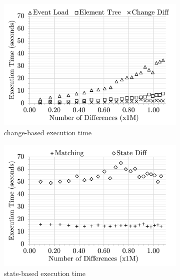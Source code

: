 \documentclass{llncs}
\begin{document}
\begin{figure}[ht]
    \centering
    \begin{subfigure}[t]{0.495\linewidth}
        \includegraphics[width=\linewidth]{images/Time-ChangeDiff-Detail}
        \caption{change-based execution time}
        \label{fig:time_changediff_detail}
    \end{subfigure}
    \hfill
    \begin{subfigure}[t]{0.495\linewidth}
        \includegraphics[width=\linewidth]{images/Time-StateDiff-Detail}
        \caption{state-based execution time}
        \label{fig:time_statediff_detail}
    \end{subfigure}
\begin{subfigure}[t]{0.495\linewidth}

\end{subfigure}
\end{figure}
\end{document}
